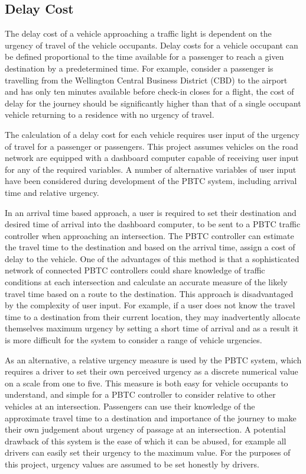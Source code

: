 \subsection{Delay Cost}
\label{sec:design_delay_cost}

The delay cost of a vehicle approaching a traffic light is dependent on the urgency of travel of the vehicle occupants. Delay costs for a vehicle occupant can be defined proportional to the time available for a passenger to reach a given destination by a predetermined time. For example, consider a passenger is travelling from the Wellington Central Business District (CBD) to the airport and has only ten minutes available before check-in closes for a flight, the cost of delay for the journey should be significantly higher than that of a single occupant vehicle returning to a residence with no urgency of travel. 

The calculation of a delay cost for each vehicle requires user input of the urgency of travel for a passenger or passengers. This project assumes vehicles on the road network are equipped with a dashboard computer capable of receiving user input for any of the required variables. A number of alternative variables of user input have been considered during development of the PBTC system, including arrival time and relative urgency. 

In an arrival time based approach, a user is required to set their destination and desired time of arrival into the dashboard computer, to be sent to a PBTC traffic controller when approaching an intersection. The PBTC controller can estimate the travel time to the destination and based on the arrival time, assign a cost of delay to the vehicle. One of the advantages of this method is that a sophisticated network of connected PBTC controllers could share knowledge of traffic conditions at each intersection and calculate an accurate measure of the likely travel time based on a route to the destination. This approach is disadvantaged by the complexity of user input. For example, if a user does not know the travel time to a destination from their current location, they may inadvertently allocate themselves maximum urgency by setting a short time of arrival and as a result it is more difficult for the system to consider a range of vehicle urgencies.

As an alternative, a relative urgency measure is used by the PBTC system, which requires a driver to set their own perceived urgency as a discrete numerical value on a scale from one to five. This measure is both easy for vehicle occupants to understand, and simple for a PBTC controller to consider relative to other vehicles at an intersection. Passengers can use their knowledge of the approximate travel time to a destination and importance of the journey to make their own judgement about urgency of passage at an intersection. A potential drawback of this system is the ease of which it can be abused, for example all drivers can easily set their urgency to the maximum value. For the purposes of this project, urgency values are assumed to be set honestly by drivers.

